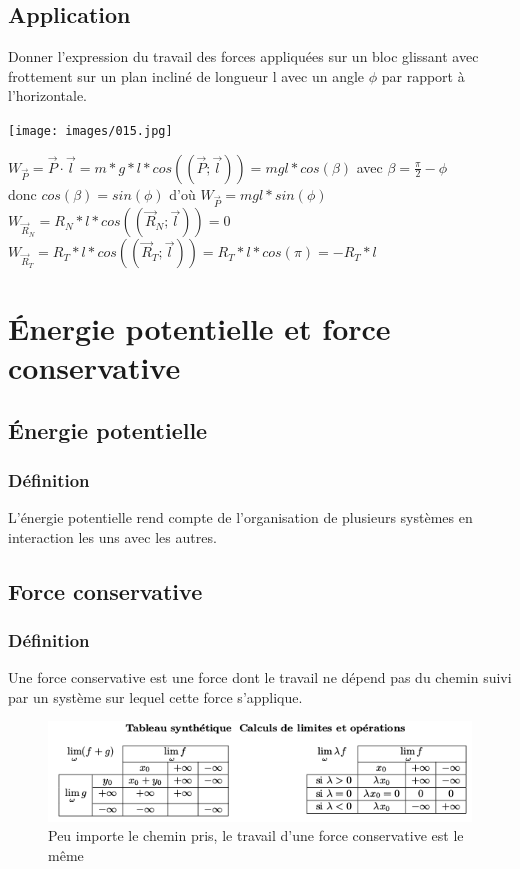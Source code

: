 \documentclass[a4paper,10pt]{book}
\begin{document}
\subsection{Application}

Donner l'expression du travail des forces appliquées sur un bloc glissant avec frottement sur un plan incliné de longueur l avec un angle $\phi$ par rapport à l'horizontale.\\
\begin{center} \texttt{[image: images/015.jpg]} \end{center}

$W_{\vec{P}}=\vec{P}\cdot\vec{l}=m*g*l*cos((\vec{P};\vec{l}))=mgl*cos(\beta)$ avec $\beta=\frac{\pi}{2}-\phi$\\
donc $cos(\beta)=sin(\phi)$ d'où $W_{\vec{P}}=mgl*sin(\phi)$\\

$W_{\vec{R}_{N}}=R_{N}*l*cos((\vec{R}_{N};\vec{l}))=0$\\

$W_{\vec{R}_{T}}=R_{T}*l*cos((\vec{R}_{T};\vec{l}))=R_{T}*l*cos(\pi)=-R_{T}*l$

\section{Énergie potentielle et force conservative}
\subsection{Énergie potentielle}
\subsubsection{Définition}
L'énergie potentielle rend compte de l'organisation de plusieurs systèmes en interaction les uns avec les autres. 

\subsection{Force conservative}
\subsubsection{Définition}
Une force conservative est une force dont le travail ne dépend pas du chemin suivi par un système sur lequel cette force s'applique.

\begin{figure}[h] \begin{center} \includegraphics[scale=0.25]{images/024.png}
\caption{Peu importe le chemin pris, le travail d'une force conservative est le même}\end{center} \end{figure}
\end{document}
